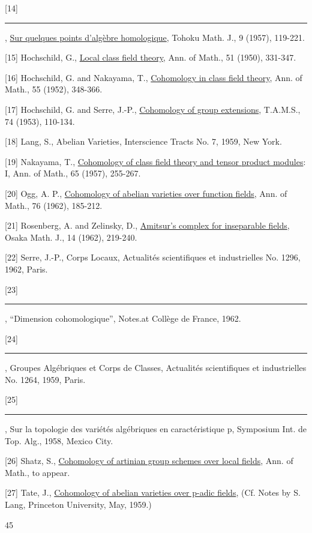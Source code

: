 [14] \rule{2cm}{0.4pt}, \uline{Sur quelques points d'algèbre homologique}, Tohoku Math. J., 9 (1957), 119-221.

[15] Hochschild, G., \uline{Local class field theory}, Ann. of Math., 51 (1950), 331-347.

[16] Hochschild, G. and Nakayama, T., \uline{Cohomology in class field theory}, Ann. of Math., 55 (1952), 348-366.

[17] Hochschild, G. and Serre, J.-P., \uline{Cohomology of group extensions}, T.A.M.S., 74 (1953), 110-134.

[18] Lang, S., Abelian Varieties, Interscience Tracts No. 7, 1959, New York.

[19] Nakayama, T., \uline{Cohomology of class field theory and tensor product modules}: I, Ann. of Math., 65 (1957), 255-267.

[20] Ogg, A. P., \uline{Cohomology of abelian varieties over function fields}, Ann. of Math., 76 (1962), 185-212.

[21] Rosenberg, A. and Zelinsky, D., \uline{Amitsur's complex for inseparable fields}, Osaka Math. J., 14 (1962), 219-240.

[22] Serre, J.-P., Corps Locaux, Actualités scientifiques et industrielles No. 1296, 1962, Paris.

[23] \rule{2cm}{0.4pt}, ``Dimension cohomologique'', Notes.at Collège de France, 1962.

[24] \rule{2cm}{0.4pt}, Groupes Algébriques et Corps de Classes, Actualités scientifiques et industrielles No. 1264, 1959, Paris.

[25] \rule{2cm}{0.4pt}, Sur la topologie des variétés algébriques en caractéristique p, Symposium Int. de Top. Alg., 1958, Mexico City.

[26] Shatz, S., \uline{Cohomology of artinian group schemes over local fields}, Ann. of Math., to appear.

[27] Tate, J., \uline{Cohomology of abelian varieties over p-adic fields}, (Cf. Notes by S. Lang, Princeton University, May, 1959.)

\begin{center}45\end{center}
